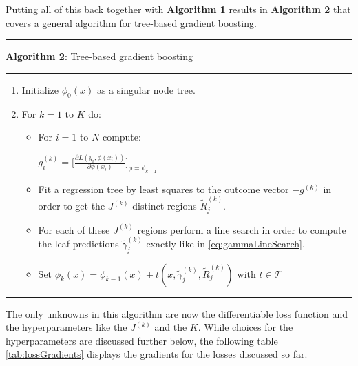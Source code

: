 \documentclass[
]{book}
\begin{document}
Putting all of this back together with \textbf{Algorithm 1} results in \textbf{Algorithm 2} that covers a general algorithm for tree-based gradient boosting.

\begin{center}\rule{0.5\linewidth}{0.5pt}\end{center}

\textbf{Algorithm 2}: Tree-based gradient boosting \citep{elements}

\begin{center}\rule{0.5\linewidth}{0.5pt}\end{center}

\begin{enumerate}
\def\labelenumi{\arabic{enumi}.}
\item
  Initialize \(\phi_0(x)\) as a singular node tree.
\item
  For \(k = 1\) to \(K\) do:

  \begin{itemize}
  \item
    For \(i = 1\) to \(N\) compute:

    \(g^{(k)}_{i} = \bigg[\frac{\partial L(y_i, \phi(x_i))}{\partial \phi(x_i)}\bigg]_{\phi = \phi_{k-1}}\)
  \item
    Fit a regression tree by least squares to the outcome vector \(-g^{(k)}\) in order to get the \(J^{(k)}\) distinct regions \(\tilde{R}^{(k)}_j\).
  \item
    For each of these \(J^{(k)}\) regions perform a line search in order to compute the leaf predictions \(\tilde{\gamma}^{(k)}_{j}\) exactly like in \eqref{eq:gammaLineSearch}.
  \item
    Set \(\phi_k(x) = \phi_{k-1}(x) + t(x,\tilde {\gamma}^{(k)}_{j},\tilde{R}^{(k)}_j)\) with \(t \in \mathcal{T}\)
  \end{itemize}
\end{enumerate}

\begin{center}\rule{0.5\linewidth}{0.5pt}\end{center}

The only unknowns in this algorithm are now the differentiable loss function and the hyperparameters like the \(J^{(k)}\) and the \(K\). While choices for the hyperparameters are discussed further below, the following table \ref{tab:lossGradients} displays the gradients for the losses discussed so far.
\end{document}
